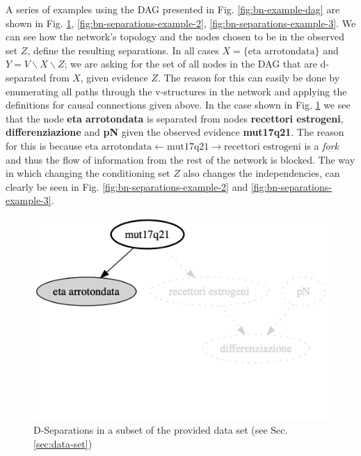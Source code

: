 A series of examples using the DAG presented in Fig. \ref{fig:bn-example-dag} are shown in Fig. \ref{fig:bn-separations-example-1}, \ref{fig:bn-separations-example-2}, \ref{fig:bn-separations-example-3}.
We can see how the network's topology and the nodes chosen to be in the observed set $Z$, define the resulting separations.
In all cases $X= \{ \text{eta arrotondata} \}$ and $Y=V \smallsetminus X \smallsetminus Z$; we are asking for the set of all nodes in the DAG that are d-separated from $X$, given evidence $Z$.
The reason for this can easily be done by enumerating all paths through the v-structures in the network and applying the definitions for causal connections given above.
In the case shown in Fig. \ref{fig:bn-separations-example-1} we see that the node \textbf{eta arrotondata} is separated from nodes \textbf{recettori estrogeni}, \textbf{differenziazione} and \textbf{pN} given the observed evidence \textbf{mut17q21}.
The reason for this is because \textbf{$\text{eta arrotondata} \leftarrow \text{mut17q21} \rightarrow \text{recettori estrogeni}$} is a \textit{fork} and thus the flow of information from the rest of the network is blocked.
The way in which changing the conditioning set $Z$ also changes the independencies, can clearly be seen in Fig. \ref{fig:bn-separations-example-2} and \ref{fig:bn-separations-example-3}.

\begin{figure}[htbp]
\centerline{\includegraphics[width=\columnwidth]{mathematical-background/images/bn-example-separations-1}}
\caption{D-Separations in a subset of the provided data set (see Sec. \ref{sec:data-set})}
\label{fig:bn-separations-example-1}
\end{figure}

